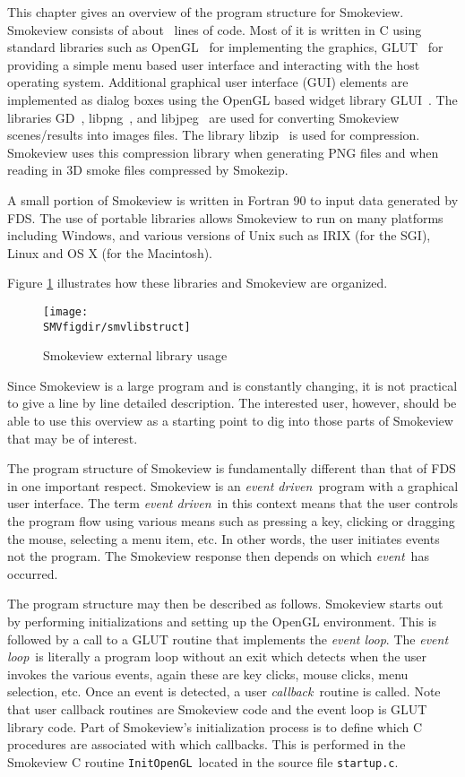 \documentclass[11pt,twoside]{book}
\begin{document}
This chapter gives an overview of the program structure for
Smokeview. Smokeview consists of about \smvlines\ lines of code.
Most of it is written in C using standard libraries such as
OpenGL~\cite{OpenGLRed} for implementing the graphics,
GLUT~\cite{OpenGLGlut} for providing a simple menu based user
interface and interacting with the host operating system.
Additional graphical user interface (GUI) elements are implemented
as dialog boxes using the OpenGL based widget library
GLUI~\cite{GLUILIB}. The libraries GD~\cite{GDLIB},
libpng~\cite{PNGLIB}, and libjpeg~\cite{JPEGLIB} are used for
converting Smokeview scenes/results into images files. The library
libzip~\cite{ZLIB} is used for compression. Smokeview uses this
compression library when generating PNG files and when reading in
3D smoke files compressed by Smokezip.

A small portion of Smokeview is written in Fortran 90 to input
data generated by FDS.  The use of portable libraries allows
Smokeview to run on many platforms including Windows, and various
versions of Unix such as IRIX (for the SGI), Linux and OS X (for
the Macintosh).

Figure \ref{smvlibstruct} illustrates how these libraries and
Smokeview are organized.

\begin{figure}
\texttt{[image: \\SMVfigdir/smvlibstruct]}
\caption{Smokeview external library usage}
\label{smvlibstruct}
\end{figure}


Since Smokeview is a large program and is constantly changing, it
is not practical to give a line by line detailed description. The
interested user, however, should be able to use this overview as a
starting point to dig into those parts of Smokeview that may be of
interest.

The program structure of Smokeview is fundamentally different than
that of FDS in one important respect.  Smokeview is an {\em event
driven}\ program with a graphical user interface.  The term {\em
event driven}\ in this context means that the user controls the
program flow using various means such as pressing a key, clicking
or dragging the mouse, selecting a menu item, etc.  In other
words, the user initiates events not the program. The Smokeview
response then depends on which {\em event}\ has occurred.

The program structure may then be described as follows. Smokeview
starts out by performing initializations and setting up the
OpenGL environment. This is followed by a call to a GLUT routine
that implements the {\em event loop}. The {\em event loop}\ is
literally a program loop without an exit which detects when the
user invokes the various events, again these are key clicks, mouse
clicks, menu selection, etc. Once an event is detected, a
user {\em callback}\ routine is called.  Note that user callback
routines are Smokeview code and the event loop is GLUT library
code. Part of Smokeview's initialization process is to define
which C procedures are associated with which callbacks.  This is
performed in the Smokeview C routine {\tt InitOpenGL}\ located in
the source file {\tt startup.c}.
\end{document}

